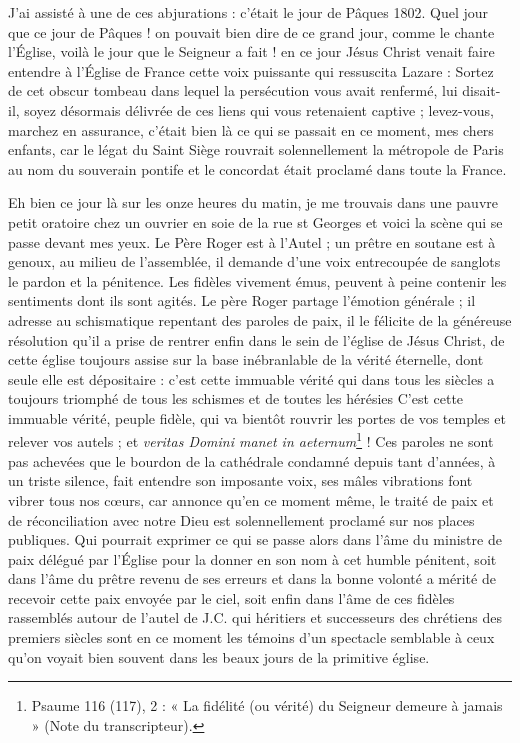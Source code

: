 \documentclass[11pt,a4paper]{report}
\begin{document}
J'ai assisté à une de ces abjurations : c'était le jour de Pâques 1802. Quel jour que ce jour de Pâques ! on pouvait bien dire de ce grand jour, comme le chante l'Église, voilà le jour que le Seigneur a fait ! en ce jour Jésus Christ venait faire entendre à l'Église de France cette voix puissante qui ressuscita Lazare : Sortez de cet obscur tombeau dans lequel la persécution vous avait renfermé, lui disait-il, soyez désormais délivrée de ces liens qui vous retenaient captive ; levez-vous, marchez en assurance, c'était bien là ce qui se passait en ce moment, mes chers enfants, car le légat du Saint Siège rouvrait solennellement la métropole de Paris au nom du souverain pontife et le concordat était proclamé dans toute la France.

Eh bien ce jour là sur les onze heures du matin, je me trouvais dans une pauvre petit oratoire chez un ouvrier en soie de la rue st Georges et voici la scène qui se passe devant mes yeux. Le Père Roger est à l'Autel ; un prêtre en soutane est à genoux, au milieu de l'assemblée, il demande d'une voix entrecoupée de sanglots le pardon et la pénitence. Les fidèles vivement émus, peuvent à peine contenir les sentiments dont ils sont agités. Le père Roger partage l'émotion générale ; il adresse au schismatique repentant des paroles de paix, il le félicite de la généreuse résolution qu'il a prise de rentrer enfin dans le sein de l'église de Jésus Christ, de cette église toujours assise sur la base inébranlable de la vérité éternelle, dont seule elle est dépositaire : c'est cette immuable vérité qui dans tous les siècles a toujours triomphé de tous les schismes et de toutes les hérésies C'est cette immuable vérité, peuple fidèle, qui va bientôt rouvrir les portes de vos temples et relever vos autels ; et \textit{veritas Domini manet in aeternum}\footnote{Psaume 116 (117), 2 : « La fidélité (ou vérité) du Seigneur demeure à jamais » (Note du transcripteur).} ! Ces paroles ne sont pas achevées que le bourdon de la cathédrale condamné depuis tant d'années, à un triste silence, fait entendre son imposante voix, ses mâles vibrations font vibrer tous nos cœurs, car annonce qu'en ce moment même, le traité de paix et de réconciliation avec notre Dieu est solennellement proclamé sur nos places publiques. Qui pourrait exprimer ce qui se passe alors dans l'âme du ministre de paix délégué par l'Église pour la donner en son nom à cet humble pénitent, soit dans l'âme du prêtre revenu de ses erreurs et dans la bonne volonté a mérité de recevoir cette paix envoyée par le ciel, soit enfin dans l'âme de ces fidèles rassemblés autour de l'autel de J.C. qui héritiers et successeurs des chrétiens des premiers siècles sont en ce moment les témoins d'un spectacle semblable à ceux qu'on voyait bien souvent dans les beaux jours de la primitive église.
\end{document}
